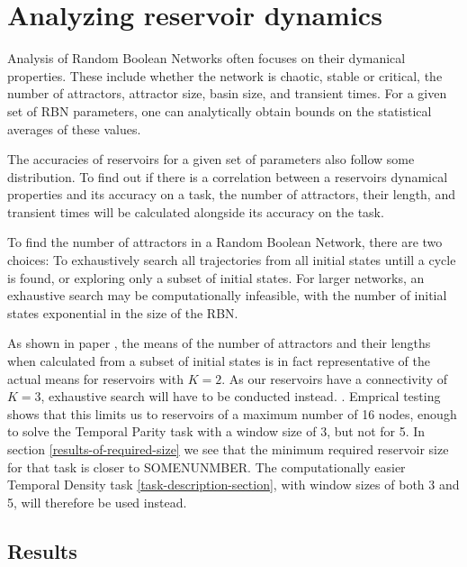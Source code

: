 \section{Analyzing reservoir dynamics}

Analysis of Random Boolean Networks often focuses on their dymanical properties.
These include whether the network is chaotic, stable or critical,
the number of attractors, attractor size, basin size, and transient times.
For a given set of RBN parameters, one can analytically obtain bounds on the statistical averages of these values.

The accuracies of reservoirs for a given set of parameters also follow some distribution.
To find out if there is a correlation between a reservoirs dynamical properties and its accuracy on a task,
the number of attractors, their length, and transient times will be calculated alongside its accuracy on the task.

To find the number of attractors in a Random Boolean Network, there are two choices:
To exhaustively search all trajectories from all initial states untill a cycle is found,
or exploring only a subset of initial states.
For larger networks, an exhaustive search may be computationally infeasible,
with the number of initial states exponential in the size of the RBN.

As shown in paper ,
the means of the number of attractors and their lengths when calculated from a subset of initial states is in fact representative of the actual means for reservoirs with $K=2$.
As our reservoirs have a connectivity of $K = 3$, exhaustive search will have to be conducted instead.
.
Emprical testing shows that this limits us to reservoirs of a maximum number of 16 nodes,
enough to solve the Temporal Parity task with a window size of 3, but not for 5.
In section \ref{results-of-required-size} we see that the minimum required reservoir size for that task is closer to SOMENUNMBER.
The computationally easier Temporal Density task \ref{task-description-section},
with window sizes of both 3 and 5,
will therefore be used instead.


\subsection{Results}

